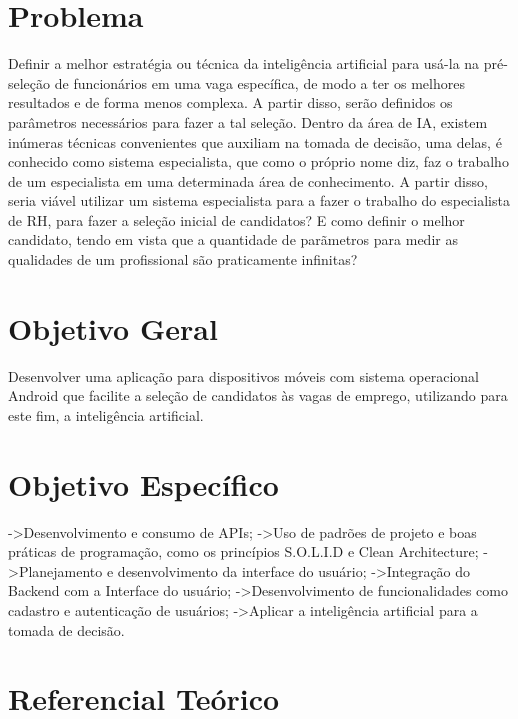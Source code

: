 \documentclass{document}
\begin{document}
    \section{Problema}

    Definir a melhor estratégia ou técnica da inteligência artificial para usá-la na pré-seleção de funcionários em uma vaga específica, de
    modo a ter os melhores resultados e de forma menos complexa. A partir disso, serão definidos os parâmetros necessários para fazer a tal 
    seleção. Dentro da área de IA, existem inúmeras técnicas convenientes que auxiliam na tomada de decisão, uma delas, é conhecido como 
    sistema especialista, que como o próprio nome diz, faz o trabalho de um especialista em uma determinada área de conhecimento. A partir disso,
    seria viável utilizar um sistema especialista para a fazer o trabalho do especialista de RH, para fazer a seleção inicial de 
    candidatos? E como definir o melhor candidato, tendo em vista que a quantidade de parãmetros para medir as qualidades de um profissional são
    praticamente infinitas?

    \section{Objetivo Geral}

    Desenvolver uma aplicação para dispositivos móveis com sistema operacional Android que facilite a seleção de candidatos às vagas de emprego,
    utilizando para este fim, a inteligência artificial. 

    \section{Objetivo Específico}

    ->Desenvolvimento e consumo de APIs; 
    ->Uso de padrões de projeto e boas práticas de programação, como os princípios S.O.L.I.D e Clean Architecture; 
    ->Planejamento e desenvolvimento da interface do usuário; 
    ->Integração do Backend com a Interface do usuário; 
    ->Desenvolvimento de funcionalidades como cadastro e autenticação de usuários;
    ->Aplicar a inteligência artificial para a tomada de decisão.

    \section{Referencial Teórico}
\end{document}
